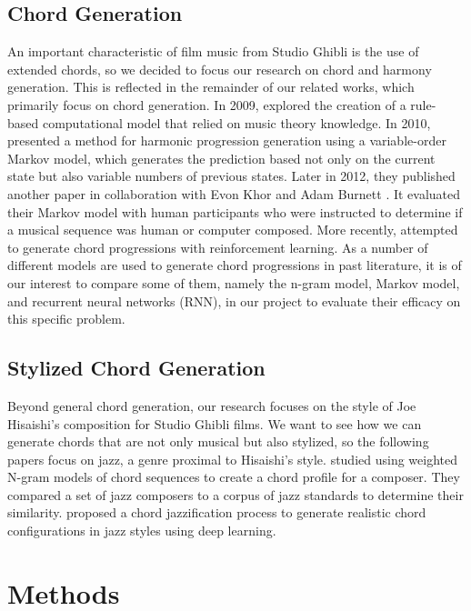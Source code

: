 \documentclass[11pt,a4paper]{article}
\begin{document}
\subsection{Chord Generation}
An important characteristic of film music from Studio Ghibli is the use of extended chords, so we decided to focus our research on chord and harmony generation. This is reflected in the remainder of our related works, which primarily focus on chord generation. In 2009, \citet{anders2009} explored the creation of a rule-based computational model that relied on music theory knowledge. In 2010, \citet{eigenfeldt2010} presented a method for harmonic progression generation using a variable-order Markov model, which generates the prediction based not only on the current state but also variable numbers of previous states. Later in 2012, they published another paper in collaboration with Evon Khor and Adam Burnett \citep{burnett2012}. It evaluated their Markov model with human participants who were instructed to determine if a musical sequence was human or computer composed. More recently, \citet{shukla2018} attempted to generate chord progressions with reinforcement learning. As a number of different models are used to generate chord progressions in past literature, it is of our interest to compare some of them, namely the n-gram model, Markov model, and recurrent neural networks (RNN), in our project to evaluate their efficacy on this specific problem. 

\subsection{Stylized Chord Generation}
Beyond general chord generation, our research focuses on the style of Joe Hisaishi’s composition for Studio Ghibli films. We want to see how we can generate chords that are not only musical but also stylized, so the following papers focus on jazz, a genre proximal to Hisaishi’s style. \citet{ogihara2008} studied using weighted N-gram models of chord sequences to create a chord profile for a composer. They compared a set of jazz composers to a corpus of jazz standards to determine their similarity. \citet{chen2020} proposed a chord jazzification process to generate realistic chord configurations in jazz styles using deep learning. 

\section{Methods}
\end{document}
